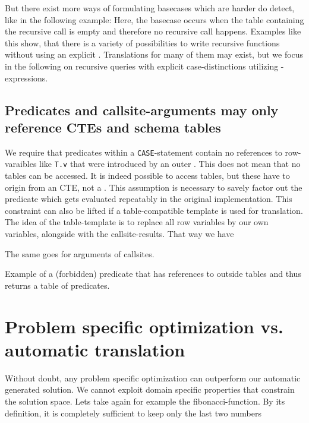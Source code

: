 But there exist more ways of formulating basecases which are harder do detect, like in the following example:
Here, the basecase occurs when the table containing the recursive call is empty and therefore no recursive call happens. Examples like this show, that there is a variety of possibilities to write recursive functions without using an explicit \CASE. Translations for many of them may exist, but we focus in the following on recursive queries with explicit case-distinctions utilizing \CASE-expressions.

\subsection{Predicates and callsite-arguments may only reference CTEs and schema tables}
We require that predicates within a \texttt{CASE}-statement contain no references to row-varaibles like \texttt{T.v} that were introduced by an outer \FROM. This does not mean that no tables can be accessed. It is indeed possible to access tables, but these have to origin from an CTE, not a \FROM. This assumption is necessary to savely factor out the predicate which gets evaluated repeatably in the original implementation. This constraint can also be lifted if a table-compatible template is used for translation. The idea of the table-template is to replace all row variables by our own variables, alongside with the callsite-results. That way we have 

The same goes for arguments of callsites.

\begin{listing}[ht]
\caption{Example of a (forbidden) predicate that has references to outside tables and thus returns a table of predicates.}
\label{lst:from_nonselfcontained}
\end{listing}

\section{Problem specific optimization vs. automatic translation}
Without doubt, any problem specific optimization can outperform our automatic generated solution. We cannot exploit domain specific properties that constrain the solution space. Lets take again for example the fibonacci-function. By its definition, it is completely sufficient to keep only the last two numbers 

